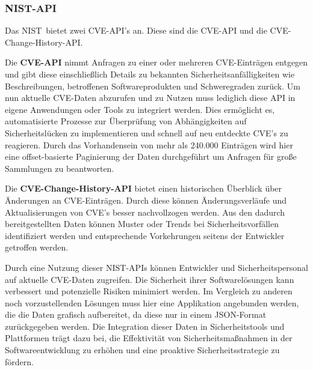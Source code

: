 \subsubsection{NIST-API} \label{sec:NIST-API}
    Das \glqq \ac{NIST}\grqq~bietet zwei \ac{CVE}-\ac{API}'s an.\textsuperscript{\cite{link:NISTAPI}}
    Diese sind die \ac{CVE}-\ac{API}\textsuperscript{\cite{link:NISTAPI}} und die \ac{CVE}-Change-History-\ac{API}\textsuperscript{\cite{link:NISTAPI}}.

    Die \textbf{\ac{CVE}-\ac{API}} nimmt Anfragen zu einer oder mehreren \ac{CVE}-Einträgen entgegen und gibt diese einschließlich Details zu bekannten Sicherheitsanfälligkeiten wie Beschreibungen, betroffenen Softwareprodukten und Schweregraden zurück.
    Um nun aktuelle \ac{CVE}-Daten abzurufen und zu Nutzen muss lediglich diese \ac{API} in eigene Anwendungen oder Tools zu integriert werden.
    Dies ermöglicht es, automatisierte Prozesse zur Überprüfung von Abhängigkeiten auf Sicherheitslücken zu implementieren und schnell auf neu entdeckte \ac{CVE}'s zu reagieren.
    Durch das Vorhandensein von mehr als 240.000 Einträgen wird hier eine offset-basierte Paginierung der Daten durchgeführt um Anfragen für große Sammlungen zu beantworten.

    Die \textbf{\ac{CVE}-Change-History-\ac{API}} bietet einen historischen Überblick über Änderungen an \ac{CVE}-Einträgen.
    Durch diese können Änderungsverläufe und Aktualisierungen von \ac{CVE}'s besser nachvollzogen werden.
    Aus den dadurch bereitgestellten Daten können Muster oder Trends bei Sicherheitsvorfällen identifiziert werden und entsprechende Vorkehrungen seitens der Entwickler getroffen werden.

    Durch eine Nutzung dieser \ac{NIST}-\ac{API}s können Entwickler und Sicherheitspersonal auf aktuelle \ac{CVE}-Daten zugreifen.
    Die Sicherheit ihrer Softwarelösungen kann verbessert und potenzielle Risiken minimiert werden.
    Im Vergleich zu anderen noch vorzustellenden Lösungen muss hier eine Applikation angebunden werden, die die Daten grafisch aufbereitet, da diese nur in einem JSON-Format zurückgegeben werden. 
    Die Integration dieser Daten in Sicherheitstools und Plattformen trägt dazu bei, die Effektivität von Sicherheitsmaßnahmen in der Softwareentwicklung zu erhöhen und eine proaktive Sicherheitsstrategie zu fördern.
